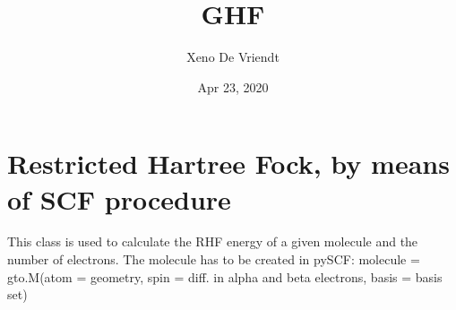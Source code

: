 \documentclass[letterpaper,10pt,english]{sphinxmanual}
\title{GHF}
\date{Apr 23, 2020}
\author{Xeno De Vriendt}
\begin{document}
\pagestyle{empty}
\sphinxmaketitle
\pagestyle{plain}
\sphinxtableofcontents
\pagestyle{normal}
\label{\detokenize{index::doc}}

\label{\detokenize{RHF:module-hf.HartreeFock.RHF}}

\chapter{Restricted Hartree Fock, by means of SCF procedure}
\label{\detokenize{RHF:restricted-hartree-fock-by-means-of-scf-procedure}}\label{\detokenize{RHF::doc}}
This class is used to calculate the RHF energy of a given molecule and the number of electrons.
The molecule has to be created in pySCF:
molecule = gto.M(atom = geometry, spin = diff. in alpha and beta electrons, basis = basis set)
\end{document}
